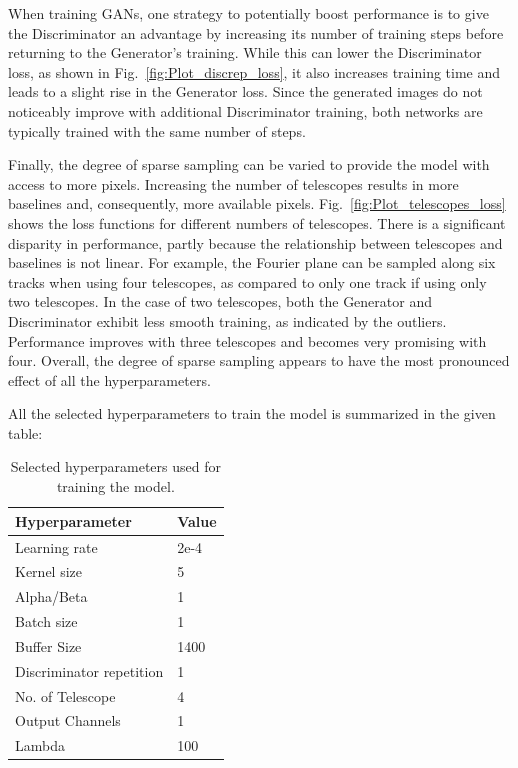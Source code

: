 When training GANs, one strategy to potentially boost performance is to give the Discriminator an advantage by increasing its number of training steps before returning to the Generator's training. While this can lower the Discriminator loss, as shown in Fig.~\ref{fig:Plot_discrep_loss}, it also increases training time and leads to a slight rise in the Generator loss. Since the generated images do not noticeably improve with additional Discriminator training, both networks are typically trained with the same number of steps.

Finally, the degree of sparse sampling can be varied to provide the model with access to more pixels. Increasing the number of telescopes results in more baselines and, consequently, more available pixels. Fig.~\ref{fig:Plot_telescopes_loss} shows the loss functions for different numbers of telescopes. There is a significant disparity in performance, partly because the relationship between telescopes and baselines is not linear. For example, the Fourier plane can be sampled along six tracks when using four telescopes, as compared to only one track if using only two telescopes. In the case of two telescopes, both the Generator and Discriminator exhibit less smooth training, as indicated by the outliers. Performance improves with three telescopes and becomes very promising with four. Overall, the degree of sparse sampling appears to have the most pronounced effect of all the hyperparameters.

All the selected hyperparameters to train the model is summarized in the given table:
\begin{table}[ht]
	\centering
	\caption{Selected hyperparameters used for training the model.}
	\label{tab:hyperparameters}
	\begin{tabular}{ll}
		\hline
		\textbf{Hyperparameter} & \textbf{Value} \\
		\hline
		Learning rate           & 2e-4 \\
		Kernel size             & 5 \\
		Alpha/Beta              & 1 \\
		Batch size              & 1 \\
		Buffer Size             & 1400 \\
		Discriminator repetition  & 1 \\
		No. of Telescope        & 4 \\
		Output Channels         & 1 \\
		Lambda                  & 100 \\
		\hline
	\end{tabular}
\end{table}

